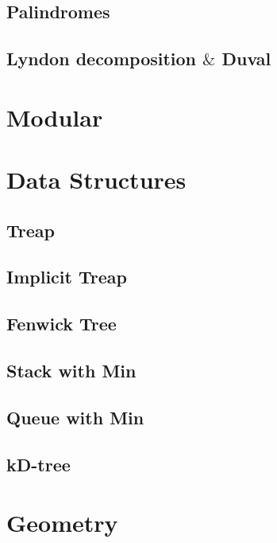 \documentclass[10pt]{article}
\begin{document}
\subsection{Palindromes}

\subsection{Lyndon decomposition $\&$ Duval}




\newpage
\section{Modular}




\newpage
\section{Data Structures}
\subsection{Treap}

\subsection{Implicit Treap}

\subsection{Fenwick Tree}

\subsection{Stack with Min}

\subsection{Queue with Min}

\subsection{kD-tree}



\newpage
\section{Geometry}
\end{document}
